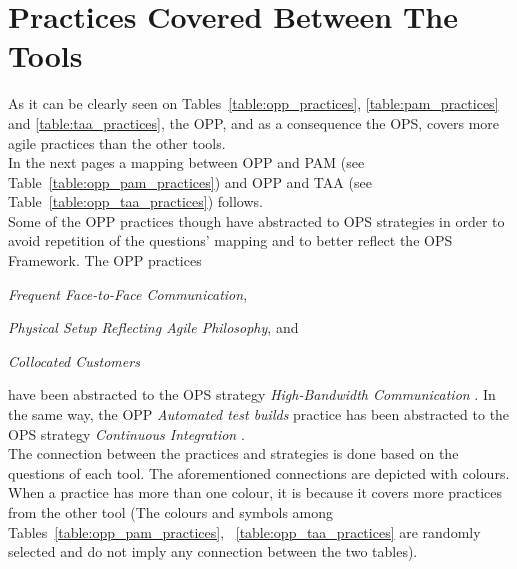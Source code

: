 \section[Tool Practices]{Practices Covered Between The Tools}

As it can be clearly seen on Tables~\ref{table:opp_practices}, \ref{table:pam_practices} and \ref{table:taa_practices}, the OPP, and as a consequence the OPS, covers more agile practices than the other tools. \\

In the next pages a mapping between OPP and PAM (see Table~\ref{table:opp_pam_practices}) and OPP and TAA (see Table~\ref{table:opp_taa_practices}) follows. \\

Some of the OPP practices though have abstracted to OPS strategies in order to avoid repetition of the questions' mapping and to better reflect the OPS Framework. The OPP practices \begin{inparaenum} [a\upshape)]
	\item \textit{Frequent Face-to-Face Communication},
	\item \textit{Physical Setup Reflecting Agile Philosophy}, and
	\item \textit{Collocated Customers}
\end{inparaenum} have been abstracted to the OPS strategy \textit{High-Bandwidth Communication}  \cite[p. 57]{sventha_dissertation}. In the same way, the OPP \textit{Automated test builds} practice has been abstracted to the OPS strategy \textit{Continuous Integration} \cite[p. 57]{sventha_dissertation}. \\

The connection between the practices and strategies is done based on the questions of each tool. The aforementioned connections are depicted with colours. When a practice has more than one colour, it is because it covers more practices from the other tool (The colours and symbols among Tables~\ref{table:opp_pam_practices}, ~\ref{table:opp_taa_practices} are randomly selected and do not imply any connection between the two tables). \\


